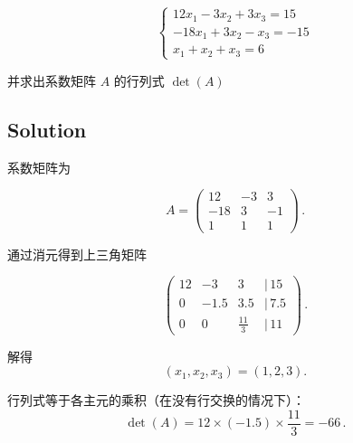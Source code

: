 \documentclass[11pt]{article}
\begin{document}
\[
\begin{cases}
12x_1 - 3x_2 + 3x_3 = 15 \\
-18x_1 + 3x_2 - x_3 = -15 \\
x_1 + x_2 + x_3 = 6
\end{cases}
\]

并求出系数矩阵 \(A\) 的行列式 \(\det(A)\)

    \subsection{Solution}\label{solution}

系数矩阵为

\[
A = \begin{pmatrix}
12 & -3 & 3 \\
-18 & 3 & -1 \\
1 & 1 & 1
\end{pmatrix}\,.
\]

通过消元得到上三角矩阵

\[
\begin{pmatrix}
12 & -3 & 3 & |\,15\\[1mm]
0 & -1.5 & 3.5 & |\,7.5\\[1mm]
0 & 0 & \tfrac{11}{3} & |\,11
\end{pmatrix}\,.
\]

解得 \[
(x_1,x_2,x_3)=(1,2,3).
\]

行列式等于各主元的乘积（在没有行交换的情况下）： \[
\det(A)=12 \times (-1.5)\times \frac{11}{3} = -66\,.
\]


    
    
    
\end{document}
